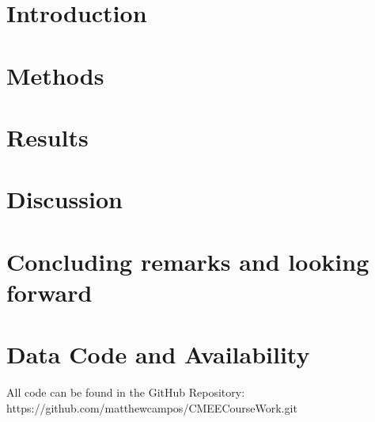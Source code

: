\documentclass[11pt]{article}
\begin{document}
\newpage

\section{Introduction}


\newpage

\section{Methods}


\newpage

\section{Results}



\section{Discussion}



\section{Concluding remarks and looking forward}



\newpage

\section{Data Code and Availability}
All code can be found in the GitHub Repository:\\
{https://github.com/matthewcampos/CMEECourseWork.git}

\newpage




\newpage
\end{document}
